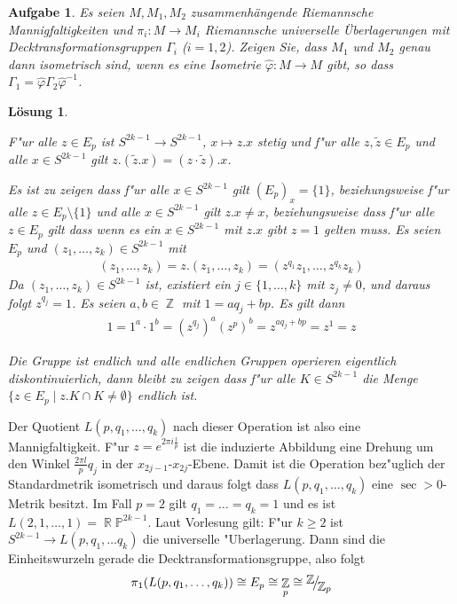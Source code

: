 \documentclass[paper=A4, twoside, chapterprefix=true, bibliography=totoc, headsepline]{scrbook}
\let\temp\phi{}
\let\phi\varphi{}
\let\varphi\temp{}
\let\temp\theta{}
\let\theta\vartheta{}
\let\vartheta\temp{}
\let\temp\epsilon{}
\let\epsilon\varepsilon{}
\let\varepsilon\temp{}
\let\temp\rho{}
\let\rho\varrho{}
\let\varrho\temp{}
\DeclareMathOperator{\R}{\mathbb{R}}
\DeclareMathOperator{\Z}{\mathbb{Z}}
\renewcommand{\P}{\ensuremath{\mathbb{P}}}
\newcommand{\FakRaum}[2]{
	\raisebox{0.7ex}{\ensuremath{#1}}
	\ensuremath{\mkern-3mu}\big/\ensuremath{\mkern-3mu}
	\raisebox{-0.6ex}{\ensuremath{#2}}}
\theoremstyle{plain}
\theoremstyle{nonumberplain}
\theoremstyle{empty}
\theoremstyle{break}
\newtheorem{Aufg}{Aufgabe}
\newtheorem{Loes}{L\"osung}
\begin{document}
\begin{Aufg}
Es seien $M, M_1,M_2$ zusammenhängende Riemannsche Mannigfaltigkeiten und $\pi_i:M \to M_i$ Riemannsche universelle Überlagerungen mit Decktransformationsgruppen $\Gamma_i$ ($i=1,2$). Zeigen Sie, dass $M_1$ und $M_2$ genau dann isometrisch sind, wenn es eine Isometrie $\hat{\phi}:M \to M$ gibt, so dass $\Gamma_1=\hat{\phi} \Gamma_2 \hat{\phi}^{-1}$.
\end{Aufg}

\begin{Loes}\begin{description}[leftmargin=*]
\item[Operation:]
	F"ur alle $z \in E_p$ ist $S^{2k-1} \to S^{2k-1}$, $x \mapsto z.x$ stetig und f"ur alle $z, \tilde z \in E_p$ und alle $x \in S^{2k-1}$ gilt $z.(\tilde z.x) = (z \cdot \tilde z).x$.
\item[Die Operation ist frei:]
	Es ist zu zeigen dass f"ur alle $x \in S^{2k-1}$ gilt $(E_p)_x = \{1\}$, beziehungsweise f"ur alle $z \in E_p \setminus \{1\}$ und alle $x \in S^{2k-1}$ gilt $z.x \ne x$, beziehungsweise dass f"ur alle $z \in E_p$ gilt dass wenn es ein $x \in S^{2k-1}$ mit $z.x$ gibt $z=1$ gelten muss.
	Es seien $E_p$ und $(z_1,\ldots ,z_k) \in S^{2k-1}$ mit
	\begin{align*}
		(z_1,\ldots , z_k) = z.(z_1,\ldots ,z_k) = (z^{q_1} z_1, \ldots , z^{q_k} z_k)
	\end{align*}
	Da $(z_1, \ldots , z_k) \in S^{2k-1}$ ist, existiert ein $j \in \{1, \ldots ,k\}$ mit $z_j \ne 0$, und daraus folgt $z^{q_j} = 1$.
	Es seien $a,b \in \Z$ mit $1 = a q_j + b p$. Es gilt dann
	\begin{align*}
		1 = 1^a \cdot 1^b = (z^{q_j})^a (z^p)^b = z^{a q_j + b p} = z^1 = z
	\end{align*}
\item[Die Operation ist eigentlich kontinuierlich]
	Die Gruppe ist endlich und alle endlichen Gruppen operieren eigentlich diskontinuierlich, dann bleibt zu zeigen dass f"ur alle $K \in S^{2k-1}$ die Menge $\{ z \in E_p \mid z.K \cap K \ne \emptyset \}$ endlich ist.
\end{description}\end{Loes}

Der Quotient $L(p, q_1, \ldots ,q_k)$ nach dieser Operation ist also eine Mannigfaltigkeit.
F"ur $z = e^{2 \pi i \frac{l}{p}}$ ist die induzierte Abbildung eine Drehung um den Winkel $\frac{2 \pi l}{p} q_j$ in der $x_{2j-1}$-$x_{2j}$-Ebene.
Damit ist die Operation bez"uglich der Standardmetrik isometrisch und daraus folgt dass $L(p, q_1, \ldots , q_k)$ eine $\sec > 0$-Metrik besitzt.
Im Fall $p = 2$ gilt $q_1 = \ldots = q_k = 1$ und es ist $L(2, 1, \ldots ,1) = \R\P^{2k-1}$.
Laut Vorlesung gilt: F"ur $k \ge 2$ ist $S^{2k-1} \to L(p, q_1, \ldots  q_k)$ die universelle "Uberlagerung.
Dann sind die Einheitswurzeln gerade die Decktransformationsgruppe, also folgt
\begin{align*}
	\pi_1(L(p, q_1, \ldots ,q_k)) \cong E_p \cong \Z_p \cong \FakRaum{\Z}{\Z_p}
\end{align*}
\end{document}
